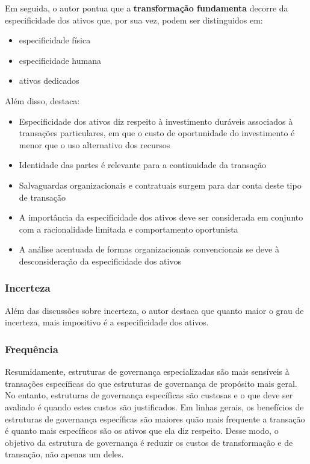 Em seguida, o autor pontua que a \textbf{transformação fundamenta} decorre da especificidade dos ativos que, por sua vez, podem ser distinguidos em:
\begin{itemize}
	\item especificidade física
	\item especificidade humana
	\item ativos dedicados
\end{itemize}
Além disso, destaca:
\begin{itemize}
	\item Especificidade dos ativos diz respeito à investimento duráveis associados à transações particulares, em que o custo de oportunidade do investimento é menor que o uso alternativo dos recursos
	\item Identidade das partes é relevante para a continuidade da transação
	\item Salvaguardas organizacionais e contratuais surgem para dar conta deste tipo de transação
	\item A importância da especificidade dos ativos deve ser considerada em conjunto com a racionalidade limitada e comportamento oportunista
	\item A análise acentuada de formas organizacionais convencionais se deve à desconsideração da especificidade  dos ativos
\end{itemize}

\subsubsection*{Incerteza}

Além das discussões sobre incerteza, o autor destaca que quanto maior o grau de incerteza, mais impositivo é a especificidade dos ativos.

\subsubsection*{Frequência}

Resumidamente, estruturas de governança especializadas são mais sensíveis à transações específicas do que estruturas de governança de propósito mais geral. No entanto, estruturas de governança específicas são custosas e o que deve ser avaliado é quando estes custos são justificados. Em linhas gerais, os benefícios de estruturas de governança específicas são maiores quão mais frequente a transação é quanto mais específicos são os ativos que ela diz respeito. Desse modo, o objetivo da estrutura de governança é reduzir os custos de transformação e de transação, não apenas um deles.

